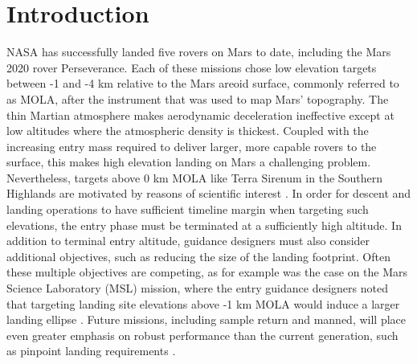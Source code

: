 \documentclass[journal ]{new-aiaa}
\begin{document}
\section*{Introduction}


\lettrine{N}{ASA} has successfully landed five rovers on Mars to date, including the Mars 2020 rover Perseverance. Each of these missions chose low elevation targets between -1 and -4 km relative to the Mars areoid surface, commonly referred to as MOLA, after the instrument that was used to map Mars' topography. The thin Martian atmosphere makes aerodynamic deceleration ineffective except at low altitudes where the atmospheric density is thickest. Coupled with the increasing entry mass required to deliver larger, more capable rovers to the surface, this makes high elevation landing on Mars a challenging problem. Nevertheless, targets above 0 km MOLA like Terra Sirenum in the Southern Highlands are motivated by reasons of scientific interest \cite{MarsWater}. In order for descent and landing operations to have sufficient timeline margin \cite{BraunMarsEDL,MSL_EDL2} when targeting such elevations, the entry phase must be terminated at a sufficiently high altitude.
In addition to terminal entry altitude, guidance designers must also consider additional objectives, such as reducing the size of the landing footprint. Often these multiple objectives are competing, as for example was the case on the Mars Science Laboratory (MSL) mission, where the entry guidance designers noted that targeting landing site elevations above -1 km MOLA would induce a larger landing ellipse \cite{MSL_EDL2}. 
Future missions, including sample return \cite{MSR} and manned, will place even greater emphasis on robust performance than the current generation, such as pinpoint landing requirements \cite{EvolvableMars}. 
\end{document}
